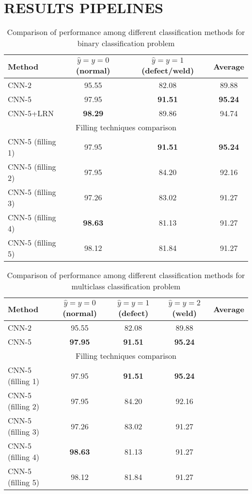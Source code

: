\section{RESULTS PIPELINES}
\label{RESULTS PIPELINES}

\begin{table}[!htb]
	\caption{\label{tab:comp1}Comparison of performance among different classification methods for binary classification problem}
	\begin{center}
		\small
		\begin{tabular}{| l | c | c | c |}
			\hline
			Method & $\hat{y}=y=0$ (normal) & $\hat{y}=y=1$ (defect/weld)  & Average \\
			\hline
			CNN-2 & 95.55 & 82.08 & 89.88 \\
			CNN-5 & 97.95 & \textbf{91.51} & \textbf{95.24} \\
			CNN-5+LRN & \textbf{98.29} & 89.86 & 94.74 \\
			\hline
			\multicolumn{4}{|c|}{Filling techniques comparison}  \\
			\hline
			CNN-5 (filling 1)  & 97.95 & \textbf{91.51} & \textbf{95.24}\\
			CNN-5 (filling 2)  & 97.95 & 84.20 & 92.16 \\
			CNN-5 (filling 3)  & 97.26 & 83.02 & 91.27 \\
			CNN-5 (filling 4)  & \textbf{98.63} & 81.13 & 91.27 \\
			CNN-5 (filling 5)  & 98.12 & 81.84 & 91.27 \\
			\hline
		\end{tabular}
	\end{center}
\end{table}

\begin{table}[!htb]
	\caption{\label{tab:comp2}Comparison of performance among different classification methods for multiclass classification problem}
	\begin{center}
		\small
		\begin{tabular}{| l | c | c | c | c |}
			\hline
			Method & $\hat{y}=y=0$ (normal) & $\hat{y}=y=1$ (defect) & $\hat{y}=y=2$ (weld)   & Average \\
			\hline
			CNN-2 & 95.55 & 82.08 & 89.88 &  \\
			CNN-5 & \textbf{97.95} & \textbf{91.51} & \textbf{95.24} &  \\
			\hline
			\multicolumn{5}{|c|}{Filling techniques comparison}  \\
			\hline
			CNN-5 (filling 1)  & 97.95 & \textbf{91.51} & \textbf{95.24} & \\
			CNN-5 (filling 2)  & 97.95 & 84.20 & 92.16 &  \\
			CNN-5 (filling 3)  & 97.26 & 83.02 & 91.27 &  \\
			CNN-5 (filling 4)  & \textbf{98.63} & 81.13 & 91.27 &  \\
			CNN-5 (filling 5)  & 98.12 & 81.84 & 91.27 &  \\
			\hline
		\end{tabular}
	\end{center}
\end{table}

